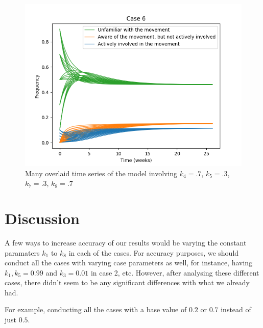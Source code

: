 \documentclass{article}
\begin{document}
    \begin{figure}[H]

        \centering
        \includegraphics[width=\textwidth]{simulation/plots/case6.png}   
        \caption{Many overlaid time series of the model involving \mbox{$k_4=.7$}, \mbox{$k_5=.3$}, \mbox{$k_7=.3$}, \mbox{$k_8=.7$}}
        \label{fig:case6}
    \end{figure}

    \section{Discussion}

    


    A few ways to increase accuracy of our results would be varying the constant paramaters $k_1$ to $k_8$ in each of the cases. For accuracy purposes, we should conduct all the cases with varying case parameters as well, for instance, having $k_1,k_5 = 0.99$ and $k_3 = 0.01$ in case 2, etc. However, after analysing these different cases, there didn't seem to be any significant differences with what we already had. 

    For example, conducting all the cases with a base value of $0.2$ or $0.7$ instead of just $0.5$.

    \newpage
    
    
\end{document}

